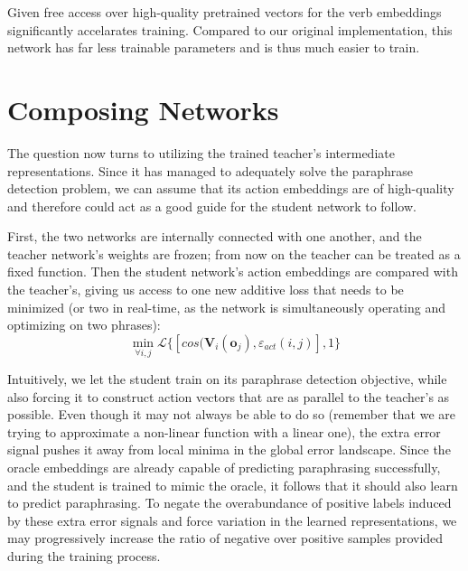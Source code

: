 \documentclass[a4paper,11pt]{article}
\begin{document}
Given free access over high-quality pretrained vectors for the verb embeddings significantly accelarates training. Compared to our original implementation, this network has far less trainable parameters and is thus much easier to train.

\section{Composing Networks}
The question now turns to utilizing the trained teacher's intermediate representations. Since it has managed to adequately solve the paraphrase detection problem, we can assume that its action embeddings are of high-quality and therefore could act as a good guide for the student network to follow. 

First, the two networks are internally connected with one another, and the teacher network's weights are frozen; from now on the teacher can be treated as a fixed function. Then the student network's action embeddings are compared with the teacher's, giving us access to one new additive loss that needs to be minimized (or two in real-time, as the network is simultaneously operating and optimizing on two phrases):
\[
\min_{\forall i,j} \mathcal{L}\{[cos(\mathbf{V}_i(\mathbf{o}_j), \varepsilon_{act}(i,j)], 1\}
\]

Intuitively, we let the student train on its paraphrase detection objective, while also forcing it to construct action vectors that are as parallel to the teacher's as possible. Even though it may not always be able to do so (remember that we are trying to approximate a non-linear function with a linear one), the extra error signal pushes it away from local minima in the global error landscape. Since the oracle embeddings are already capable of predicting paraphrasing successfully, and the student is trained to mimic the oracle, it follows that it should also learn to predict paraphrasing. To negate the overabundance of positive labels induced by these extra error signals and force variation in the learned representations, we may progressively increase the ratio of negative over positive samples provided during the training process. 
\end{document}
